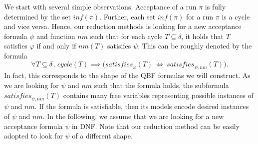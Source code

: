 \documentclass[a4paper,UKenglish,cleveref, autoref, thm-restate]{lipics-v2021}
\newcommand{\minf}{\mathit{inf}}
\newcommand{\rem}{\mathit{nm}}
\newcommand{\mcycle}{\mathit{cycle}}
\newcommand{\msat}{\mathit{satisfies}}
\begin{document}
We start with several simple observations. Acceptance of a run $\pi$
is fully determined by the set $\minf(\pi)$.
Further, each set $\minf(\pi)$ for a run $\pi$ is a cycle and vice
versa. Hence, our reduction methods is looking for a new acceptance
formula $\psi$ and function $\rem$ such that for each cycle
$T\subseteq\delta$, it holds that $T$ satisfies $\varphi$ if and only
if $\rem(T)$ satisifes $\psi$. This can be roughly denoted by the
formula
\[
  \forall T\subseteq\delta~.~\mcycle(T)\implies\big(\msat_\varphi(T) ~\iff~ \msat_{\psi,\rem}(T)\big).
\]
In fact, this corresponds to the shape of the QBF formulas we will
construct. As we are looking for $\psi$ and $\rem$ such that the
formula holds, the subformula $\msat_{\psi,\rem}(T)$ contains many
free variables representing possible instances of $\psi$ and
$\rem$. If the formula is satisfiable, then its models encode desired
instances of $\psi$ and $\rem$.  In the following, we assume that we
are looking for a new acceptance formula $\psi$ in DNF. Note that our
reduction method can be easily adopted to look for $\psi$ of a
different shape.
\end{document}
